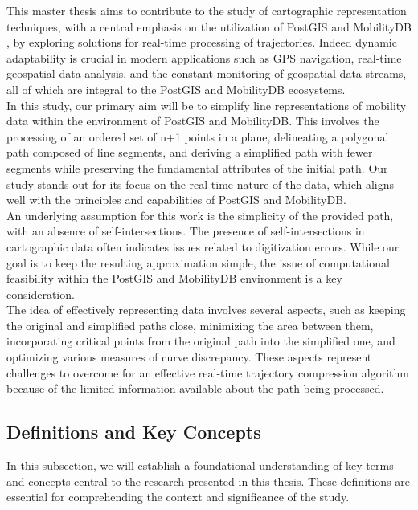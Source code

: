 This master thesis aims to contribute to the study of cartographic representation techniques, with a central emphasis on the utilization of PostGIS and MobilityDB \cite{MobilityDBTODS2020}, by exploring solutions for real-time processing of trajectories. Indeed dynamic adaptability is crucial in modern applications such as GPS navigation, real-time geospatial data analysis, and the constant monitoring of geospatial data streams, all of which are integral to the PostGIS and MobilityDB ecosystems.\\



In this study, our primary aim will be to simplify line representations of mobility data within the environment of PostGIS and MobilityDB. This involves the processing of an ordered set of n+1 points in a plane, delineating a polygonal path composed of line segments, and deriving a simplified path with fewer segments while preserving the fundamental attributes of the initial path. Our study stands out for its focus on the real-time nature of the data, which aligns well with the principles and capabilities of PostGIS and MobilityDB.\\




An underlying assumption for this work is the simplicity of the provided path, with an absence of self-intersections. The presence of self-intersections in cartographic data often indicates issues related to digitization errors. While our goal is to keep the resulting approximation simple, the issue of computational feasibility within the PostGIS and MobilityDB environment is a key consideration.\\




The idea of effectively representing data involves several aspects, such as keeping the original and simplified paths close, minimizing the area between them, incorporating critical points from the original path into the simplified one, and optimizing various measures of curve discrepancy. These aspects represent challenges to overcome for an effective real-time trajectory compression algorithm because of the limited information available about the path being processed.\\



\subsection{Definitions and Key Concepts}
In this subsection, we will establish a foundational understanding of key terms and concepts central to the research presented in this thesis. These definitions are essential for comprehending the context and significance of the study.

